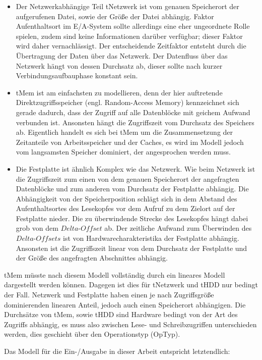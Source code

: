\documentclass[
	12pt,
	a4paper,
	BCOR10mm,
	DIV14,
	listof=totoc,
	bibliography=totoc,
	headsepline
]{scrreprt}
\begin{document}
\begin{itemize}
	\item Der Netzwerkabhängige Teil tNetzwerk ist vom genauen Speicherort der aufgerufenen Datei, sowie der Größe der Datei abhängig. Faktor Aufenthaltsort im E/A-System sollte allerdings eine eher ungeordnete Rolle spielen, zudem sind keine Informationen darüber verfügbar; dieser Faktor wird daher vernachlässigt. 
	Der entscheidende Zeitfaktor entsteht durch die Übertragung der Daten über das Netzwerk. Der Datenfluss über das Netzwerk hängt von dessen Durchsatz ab, dieser sollte nach kurzer Verbindungsaufbauphase konstant sein.
	\item tMem ist am einfachsten zu modellieren, denn der hier auftretende Direktzugriffsspeicher (engl. Random-Access Memory) kennzeichnet sich gerade dadurch, dass der Zugriff auf alle Datenblöcke mit geichem Aufwand verbunden ist.
	Ansonsten hängt die Zugriffszeit vom Durchsatz des Speichers ab.
	Eigentlich handelt es sich bei tMem um die Zusammensetzung der Zeitanteile von Arbeitsspeicher und der Caches, es wird im Modell jedoch vom langsamsten Speicher dominiert, der angesprochen werden muss.
	\item Die Festplatte ist ähnlich Komplex wie das Netzwerk. Wie beim Netzwerk ist die Zugriffszeit zum einen von dem genauen Speicherort der angefragten Datenblöcke und zum anderen vom Durchsatz der Festplatte abhängig.
	Die Abhängigkeit von der Speicherposition schlägt sich in dem Abstand des Aufenthaltsortes des Lesekopfes vor dem Aufruf zu dem Zielort auf der Festplatte nieder. Die zu überwindende Strecke des Lesekopfes hängt dabei grob von dem $Delta\text{-}Offset$ ab.
	Der zeitliche Aufwand zum Überwinden des $Delta\text{-}Offsets$ ist von Hardwarecharakteristika der Festplatte abhängig. Ansonsten ist die Zugriffszeit linear von dem Durchsatz der Festplatte und der Größe des angefragten Abschnittes abhängig.
\end{itemize}

tMem müsste nach diesem Modell vollständig durch ein lineares Modell dargestellt werden können. Dagegen ist dies für tNetzwerk und tHDD nur bedingt der Fall.
Netzwerk und Festplatte haben einen je nach Zugriffsgröße dominierenden linearen Anteil, jedoch auch einen Speicherort abhängigen.
Die Durchsätze von tMem, sowie tHDD sind Hardware bedingt von der Art des Zugriffs abhängig, es muss also zwischen Lese- und Schreibzugriffen unterschieden werden, dies geschieht über den Operationstyp (OpTyp).

Das Modell für die Ein-/Ausgabe in dieser Arbeit entspricht letztendlich:
\end{document}
